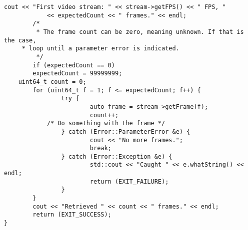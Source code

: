 \begin{lstlisting}[caption={Using the Video Framework}, label=lst:videouse]
        cout << "First video stream: " << stream->getFPS() << " FPS, "
            << expectedCount << " frames." << endl;
        /*
         * The frame count can be zero, meaning unknown. If that is the case,
	 * loop until a parameter error is indicated.
         */
        if (expectedCount == 0)
		expectedCount = 99999999;
	uint64_t count = 0;
        for (uint64_t f = 1; f <= expectedCount; f++) {
                try {
                        auto frame = stream->getFrame(f);
                        count++;
			/* Do something with the frame */
                } catch (Error::ParameterError &e) {
                        cout << "No more frames.";
                        break;
                } catch (Error::Exception &e) {
                        std::cout << "Caught " << e.whatString() << endl;
                        return (EXIT_FAILURE);
                }
        }
        cout << "Retrieved " << count << " frames." << endl;
        return (EXIT_SUCCESS);
}
\end{lstlisting}

